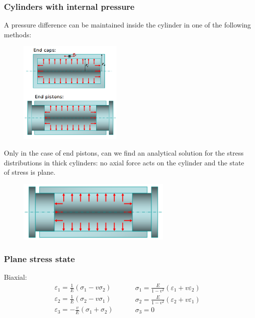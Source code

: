 \documentclass[class=report, crop=false, 12pt,a4paper]{standalone}
\begin{document}
\subsubsection{Cylinders with internal pressure}
A pressure difference can be maintained inside the cylinder in one of the following methods:
\begin{figure}[H]
    \centering
    \includegraphics[height = 5cm]{../img/diagram111.png}
    \caption{}
\end{figure}
Only in the case of end pistons, can we find an analytical solution for the stress distributions in thick cylinders: no axial force acts on the cylinder and the state of stress is plane.
\begin{figure}[H]
    \centering
    \includegraphics[height = 3cm]{../img/diagram112.png}
    \caption{}
\end{figure}
\subsubsection{Plane stress state}
Biaxial:
\begin{equation}
    \begin{array}{l}
        \varepsilon_1 = \frac{1}{E} \left(\sigma_1 - v\sigma_2\right)\\
        \varepsilon_2 = \frac{1}{E} \left(\sigma_2 - v\sigma_1\right)\\
        \varepsilon_3 = -\frac{v}{E} \left(\sigma_1 + \sigma_2\right)        
    \end{array} \hspace{1cm}
    \begin{array}{l}
        \sigma_1 = \frac{E}{1-v^2} \left(\varepsilon_1 + v\varepsilon_2\right)\\
        \sigma_2 = \frac{E}{1-v^2} \left(\varepsilon_2 + v\varepsilon_1\right)\\
        \sigma_3 = 0        
    \end{array}
\end{equation}
\end{document}
